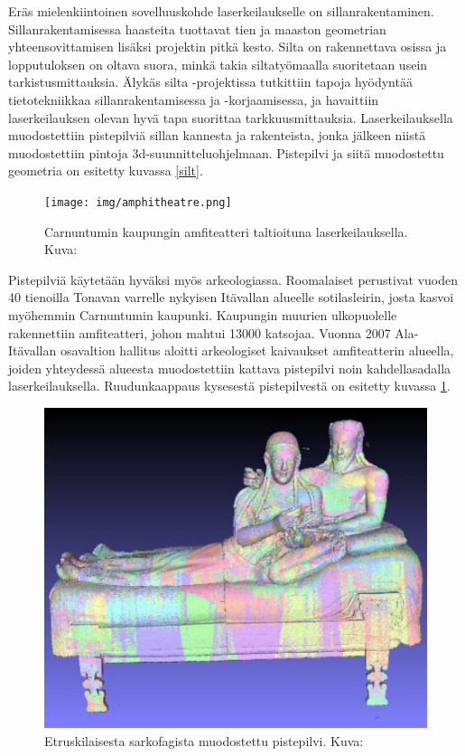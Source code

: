 Eräs mielenkiintoinen sovelluuskohde laserkeilaukselle on sillanrakentaminen. Sillanrakentamisessa haasteita tuottavat tien ja maaston geometrian yhteensovittamisen lisäksi projektin pitkä kesto. Silta on rakennettava osissa ja lopputuloksen on oltava suora, minkä takia siltatyömaalla suoritetaan usein tarkistusmittauksia. Älykäs silta -projektissa tutkittiin tapoja hyödyntää tietotekniikkaa sillanrakentamisessa ja -korjaamisessa, ja havaittiin laserkeilauksen olevan hyvä tapa suorittaa tarkkuusmittauksia. Laserkeilauksella muodostettiin pistepilviä sillan kannesta ja rakenteista, jonka jälkeen niistä muodostettiin pintoja 3d-suunnitteluohjelmaan. Pistepilvi ja siitä muodostettu geometria on esitetty kuvassa \ref{silt}. \cite{silta}   

\begin{figure}
    \centering
    \texttt{[image: img/amphitheatre.png]}
    \caption{Carnuntumin kaupungin amfiteatteri taltioituna laserkeilauksella. Kuva: \cite{Amphitheatre}}
    \label{amfi}
\end{figure}

Pistepilviä käytetään hyväksi myös arkeologiassa. Roomalaiset perustivat vuoden 40 tienoilla Tonavan varrelle nykyisen Itävallan alueelle
sotilasleirin, josta kasvoi myöhemmin Carnuntumin kaupunki. Kaupungin muurien ulkopuolelle rakennettiin amfiteatteri, johon mahtui 13000 katsojaa.
Vuonna 2007 Ala-Itävallan osavaltion hallitus aloitti arkeologiset kaivaukset amfiteatterin alueella, joiden yhteydessä alueesta muodostettiin kattava pistepilvi noin kahdellasadalla laserkeilauksella. Ruudunkaappaus kysesestä pistepilvestä on esitetty kuvassa \ref{amfi}. \cite{Carnuntum}

\begin{figure}
    \centering
    \includegraphics[width=0.4\paperwidth]{img/sarkofagi.png}
    \caption{Etruskilaisesta sarkofagista muodostettu pistepilvi. Kuva: \cite{sarkofagi}}
    \label{sarko}
\end{figure}

